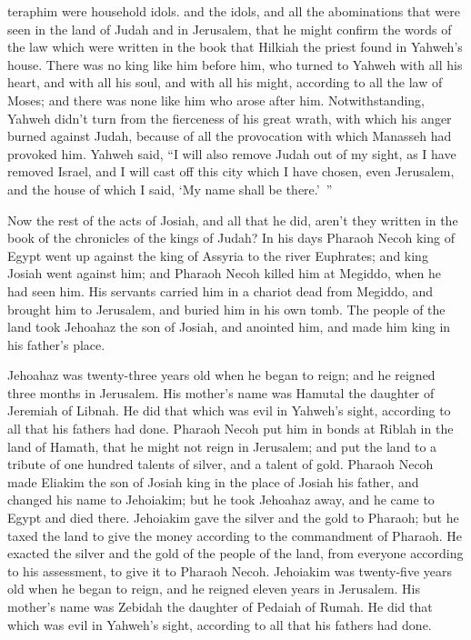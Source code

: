 {{teraphim were household idols.} and the idols, and all the abominations that were seen in the land of Judah and in Jerusalem, that he might confirm the words of the law which were written in the book that Hilkiah the priest found in Yahweh’s house.
There was no king like him before him, who turned to Yahweh with all his heart, and with all his soul, and with all his might, according to all the law of Moses; and there was none like him who arose after him.
Notwithstanding, Yahweh didn’t turn from the fierceness of his great wrath, with which his anger burned against Judah, because of all the provocation with which Manasseh had provoked him.
Yahweh said, “I will also remove Judah out of my sight, as I have removed Israel, and I will cast off this city which I have chosen, even Jerusalem, and the house of which I said, ‘My name shall be there.’ ”
\par }{\PP {}Now the rest of the acts of Josiah, and all that he did, aren’t they written in the book of the chronicles of the kings of Judah?
In his days Pharaoh Necoh king of Egypt went up against the king of Assyria to the river Euphrates; and king Josiah went against him; and Pharaoh Necoh killed him at Megiddo, when he had seen him.
His servants carried him in a chariot dead from Megiddo, and brought him to Jerusalem, and buried him in his own tomb. The people of the land took Jehoahaz the son of Josiah, and anointed him, and made him king in his father’s place.
\par }{\PP {}Jehoahaz was twenty-three years old when he began to reign; and he reigned three months in Jerusalem. His mother’s name was Hamutal the daughter of Jeremiah of Libnah.
He did that which was evil in Yahweh’s sight, according to all that his fathers had done.
Pharaoh Necoh put him in bonds at Riblah in the land of Hamath, that he might not reign in Jerusalem; and put the land to a tribute of one hundred talents of silver, and a talent of gold.
Pharaoh Necoh made Eliakim the son of Josiah king in the place of Josiah his father, and changed his name to Jehoiakim; but he took Jehoahaz away, and he came to Egypt and died there.
Jehoiakim gave the silver and the gold to Pharaoh; but he taxed the land to give the money according to the commandment of Pharaoh. He exacted the silver and the gold of the people of the land, from everyone according to his assessment, to give it to Pharaoh Necoh.
Jehoiakim was twenty-five years old when he began to reign, and he reigned eleven years in Jerusalem. His mother’s name was Zebidah the daughter of Pedaiah of Rumah.
He did that which was evil in Yahweh’s sight, according to all that his fathers had done.

}
